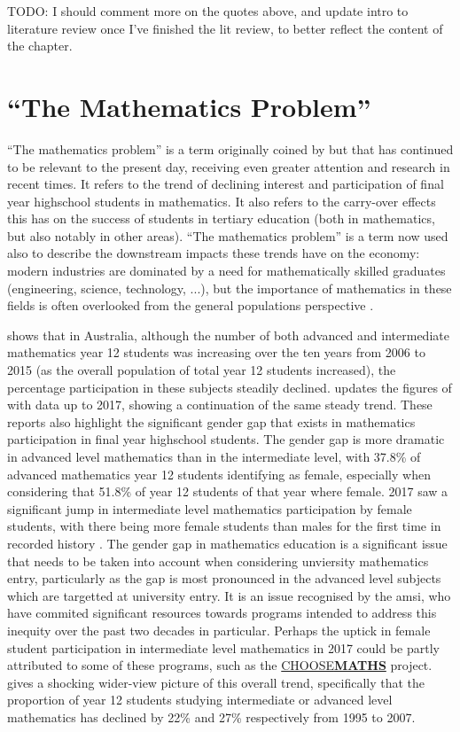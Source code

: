\documentclass[twoside,12pt,a4paper]{report}
\begin{document}
TODO: I should comment more on the quotes above, and update intro to literature review once I've finished the lit review, to better reflect the content of the chapter.


\section{``The Mathematics Problem''}

``The mathematics problem'' is a term originally coined by  but that has continued to be relevant to the present day, receiving even greater attention and research in recent times. It refers to the trend of declining interest and participation of final year highschool students in mathematics. It also refers to the carry-over effects this has on the success of students in tertiary education (both in mathematics, but also notably in other areas). ``The mathematics problem'' is a term now used also to describe the downstream impacts these trends have on the economy: modern industries  are dominated by a need for mathematically skilled graduates (engineering, science, technology, ...), but the importance of mathematics in these fields is often overlooked from the general populations perspective \cite{King2015, Gordon2013}.

 shows that in Australia, although the number of both advanced and intermediate mathematics year 12 students was increasing over the ten years from 2006 to 2015 (as the overall population of total year 12 students increased), the percentage participation in these subjects steadily declined.  updates the figures of  with data up to 2017, showing a continuation of the same steady trend. These reports also highlight the significant gender gap that exists in mathematics participation in final year highschool students. The gender gap is more dramatic in advanced level mathematics than in the intermediate level, with 37.8\% of advanced mathematics year 12 students identifying as female, especially when considering that 51.8\% of year 12 students of that year where female. 2017 saw a significant jump in intermediate level mathematics participation by female students, with there being more female students than males for the first time in recorded history \cite{James2019}. The gender gap in mathematics education is a significant issue that needs to be taken into account when considering unviersity mathematics entry, particularly as the gap is most pronounced in the advanced level subjects which are targetted at university entry. It is an issue recognised by the \gls{amsi}, who have commited significant resources towards programs intended to address this inequity over the past two decades in particular. Perhaps the uptick in female student participation in intermediate level mathematics in 2017 could be partly attributed to some of these programs, such as the \href{https://choosemaths.org.au/}{CHOOSE\textbf{MATHS}} project.  gives a shocking wider-view picture of this overall trend, specifically that the proportion of year 12 students studying intermediate or advanced level mathematics has declined by 22\% and 27\% respectively from 1995 to 2007. 
\end{document}
